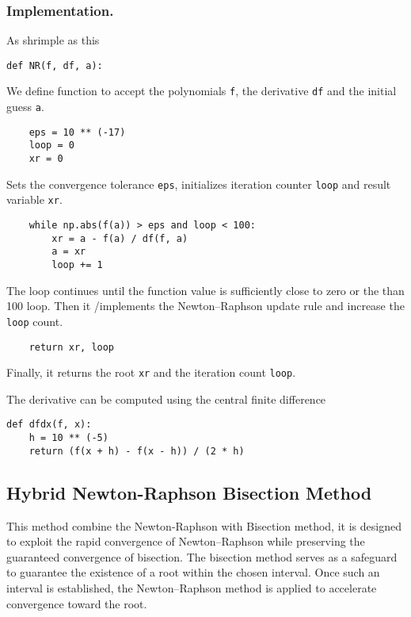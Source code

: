 \documentclass[../../../main.tex]{subfiles}
\begin{document}
\subsubsection{Implementation.}
As shrimple as this
\begin{verbatim}
def NR(f, df, a):
\end{verbatim}
We define function to accept the polynomials \verb|f|, the derivative \verb|df| and the initial guess \verb|a|.
\begin{verbatim}
    eps = 10 ** (-17)
    loop = 0
    xr = 0
\end{verbatim}
Sets the convergence tolerance \verb|eps|, initializes iteration counter \verb|loop| and result variable \verb|xr|.
\begin{verbatim}
    while np.abs(f(a)) > eps and loop < 100:
        xr = a - f(a) / df(f, a)
        a = xr
        loop += 1
\end{verbatim}
The loop continues until the function value is sufficiently close to zero or the than 100 loop.
Then it /implements the Newton–Raphson update rule and  increase the \verb|loop| count.
\begin{verbatim}
    return xr, loop
\end{verbatim}
Finally, it returns the root \verb|xr| and the iteration count \verb|loop|.

The derivative can be computed using the central finite difference
\begin{verbatim}
def dfdx(f, x):
    h = 10 ** (-5)
    return (f(x + h) - f(x - h)) / (2 * h)
\end{verbatim}

\subsection{Hybrid Newton-Raphson Bisection Method}
This method combine the Newton-Raphson with Bisection method, it is designed to exploit the rapid convergence of Newton–Raphson while preserving the guaranteed convergence of bisection.
The bisection method serves as a safeguard to guarantee the existence of a root within the chosen interval.
Once such an interval is established, the Newton–Raphson method is applied to accelerate convergence toward the root.
\end{document}
